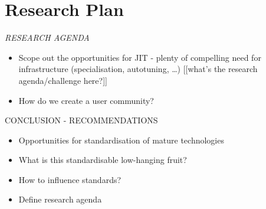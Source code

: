 \section{Research Plan}

{\it
RESEARCH AGENDA
  \begin{itemize}
  \item Scope out the opportunities for JIT - plenty of compelling need for infrastructure (specialisation, autotuning, …) [[what’s the research agenda/challenge here?]]
  \item How do we create a user community?
  \end{itemize}

CONCLUSION - RECOMMENDATIONS
  \begin{itemize}
  \item Opportunities for standardisation of mature technologies
  \item What is this standardisable low-hanging fruit?
  \item How to influence standards?
  \item Define research agenda
  \end{itemize}
}

